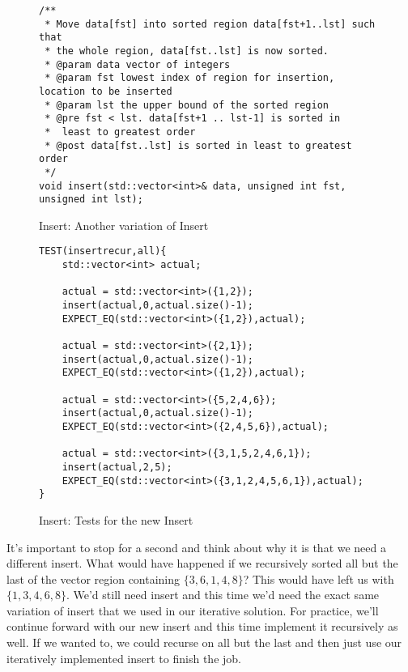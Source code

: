 \documentclass[]{tufte-handout}
\begin{document}
\begin{figure}[!htbp]
\begin{lstlisting}
/**
 * Move data[fst] into sorted region data[fst+1..lst] such that
 * the whole region, data[fst..lst] is now sorted.
 * @param data vector of integers
 * @param fst lowest index of region for insertion, location to be inserted
 * @param lst the upper bound of the sorted region
 * @pre fst < lst. data[fst+1 .. lst-1] is sorted in
 *  least to greatest order
 * @post data[fst..lst] is sorted in least to greatest order
 */
void insert(std::vector<int>& data, unsigned int fst, unsigned int lst);
\end{lstlisting}
\caption{Insert: Another variation of Insert}
\label{code:insertrecdecl}
\end{figure} 

\begin{figure}[!htbp]
\begin{lstlisting}
TEST(insertrecur,all){
    std::vector<int> actual;

    actual = std::vector<int>({1,2});
    insert(actual,0,actual.size()-1);
    EXPECT_EQ(std::vector<int>({1,2}),actual);

    actual = std::vector<int>({2,1});
    insert(actual,0,actual.size()-1);
    EXPECT_EQ(std::vector<int>({1,2}),actual);

    actual = std::vector<int>({5,2,4,6});
	insert(actual,0,actual.size()-1);
    EXPECT_EQ(std::vector<int>({2,4,5,6}),actual);

    actual = std::vector<int>({3,1,5,2,4,6,1});
	insert(actual,2,5);
    EXPECT_EQ(std::vector<int>({3,1,2,4,5,6,1}),actual);
}
\end{lstlisting}
\caption{Insert: Tests for the new Insert}
\label{code:insertrectests}
\end{figure} 

It's important to stop for a second and think about why it is that we need a different insert. What would have happened if we recursively sorted all but the last of the vector region containing $\{3,6,1,4,8\}$? This would have left us with $\{1,3,4,6,8\}$. We'd still need insert and this time we'd need the exact same variation of insert that we used in our iterative solution. For practice, we'll continue forward with our new insert and this time implement it recursively as well. If we wanted to, we could recurse on all but the last and then just use our iteratively implemented insert to finish the job. 
\end{document}
